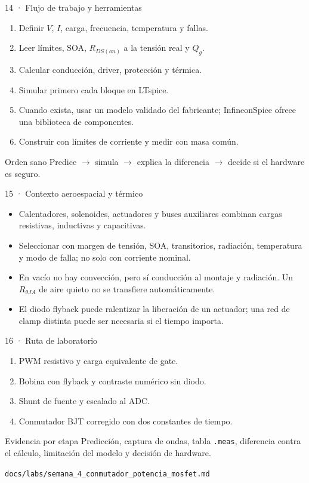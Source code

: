 \documentclass[aspectratio=169]{beamer}
\begin{document}
\begin{frame}{14 · Flujo de trabajo y herramientas}
  \begin{enumerate}
    \item Definir $V$, $I$, carga, frecuencia, temperatura y fallas.
    \item Leer límites, SOA, $R_{DS(on)}$ a la tensión real y $Q_g$.
    \item Calcular conducción, driver, protección y térmica.
    \item Simular primero cada bloque en LTspice.
    \item Cuando exista, usar un modelo validado del fabricante; InfineonSpice
      ofrece una biblioteca de componentes.
    \item Construir con límites de corriente y medir con masa común.
  \end{enumerate}
  \begin{block}{Orden sano}
    Predice $\rightarrow$ simula $\rightarrow$ explica la diferencia
    $\rightarrow$ decide si el hardware es seguro.
  \end{block}
\end{frame}

\begin{frame}{15 · Contexto aeroespacial y térmico}
  \begin{itemize}
    \item Calentadores, solenoides, actuadores y buses auxiliares combinan
      cargas resistivas, inductivas y capacitivas.
    \item Seleccionar con margen de tensión, SOA, transitorios, radiación,
      temperatura y modo de falla; no solo con corriente nominal.
    \item En vacío no hay convección, pero sí conducción al montaje y radiación.
      Un $R_{\theta JA}$ de aire quieto no se transfiere automáticamente.
    \item El diodo flyback puede ralentizar la liberación de un actuador; una
      red de clamp distinta puede ser necesaria si el tiempo importa.
  \end{itemize}
\end{frame}

\begin{frame}{16 · Ruta de laboratorio}
  \begin{enumerate}
    \item PWM resistivo y carga equivalente de gate.
    \item Bobina con flyback y contraste numérico sin diodo.
    \item Shunt de fuente y escalado al ADC.
    \item Conmutador BJT corregido con dos constantes de tiempo.
  \end{enumerate}
  \begin{block}{Evidencia por etapa}
    Predicción, captura de ondas, tabla \texttt{.meas}, diferencia contra el
    cálculo, limitación del modelo y decisión de hardware.
  \end{block}
  \vfill
  \centering
  \texttt{docs/labs/semana\_4\_conmutador\_potencia\_mosfet.md}
\end{frame}
\end{document}
